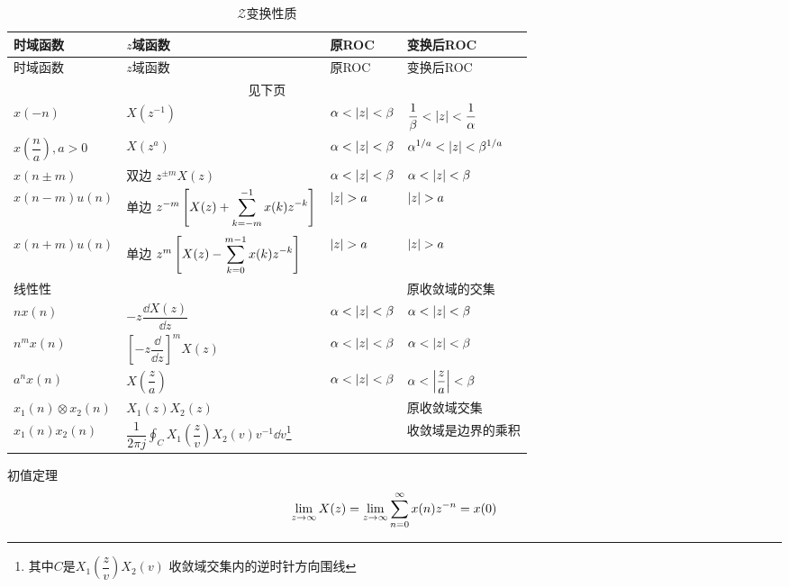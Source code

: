 \documentclass[cn,11pt,chinese,black,simple]{../elegantbook}
\begin{document}
\begin{longtable}{llll} 
    \caption{\(\mathscr{Z}\)变换性质} \\ 
    \toprule
    时域函数 & \(z\)域函数 & 原ROC  & 变换后ROC\\
    \midrule
    \endfirsthead
    
    \toprule
    时域函数 & \(z\)域函数 & 原ROC  & 变换后ROC\\
    \midrule
    \endhead 
  
    \hline
    \multicolumn{4}{c}{见下页}\\   \bottomrule
    \endfoot
  
    \bottomrule
    \endlastfoot
    \(x(-n)\) & \(X(z^{-1})\) & \(\alpha < \left| z \right| < \beta\) & \(\dfrac{1}{\beta} < \left| z \right| < \dfrac{1}{\alpha}\)\\
    \(x(\dfrac{n}{a}),a>0\) & \(X(z^a)\) & \(\alpha < \left| z \right| < \beta\) & \(\alpha^{1/a} < \left| z \right| < \beta^{1/a}\) \\
    \(x(n \pm m)\) & 双边 \(z^{\pm m}X(z)\) &  \(\alpha < \left| z \right| < \beta\) &  \(\alpha < \left| z \right| < \beta\) \\
    \(x(n - m)u(n)\) & 单边 \(z^{-m} \left[X(z) + \displaystyle\sum_{k=-m}^{-1}x(k)z^{-k}\right]\) & \(\left| z \right| > a\) & \(\left| z \right| > a\) \\
    \(x(n + m)u(n)\) & 单边 \(z^{m} \left[X(z) - \displaystyle\sum_{k=0}^{m-1}x(k)z^{-k}\right]\) & \(\left| z \right| > a\) & \(\left| z \right| > a\) \\
    线性性 & & & 原收敛域的交集 \\
    \(n x(n)\) & \(-z \dfrac{\dd{X(z)}}{\dd{z}}\) & \(\alpha < \left| z \right| < \beta\) & \(\alpha < \left| z \right| < \beta\)\\
    \(n^m x(n)\) & \(\left[-z\dfrac{\dd{}}{\dd{z}}\right]^m X(z)\) & \(\alpha < \left| z \right| < \beta\) & \(\alpha < \left| z \right| < \beta\)\\
    \(a^n x(n)\) & \(X(\dfrac{z}{a})\) &  \(\alpha < \left| z \right| < \beta\) &  \(\alpha < \left| \dfrac{z}{a} \right| < \beta\) \\
    \(x_1(n) \otimes x_2(n)\) & \(X_1(z) X_2(z)\) & & 原收敛域交集 \\
    \(x_1(n)x_2(n)\) & \(\dfrac{1}{2 \pi j}\displaystyle\oint_C X_1(\dfrac{z}{v})X_2(v) v^{-1} \dd{v} \)\footnote{其中\(C\)是\(X_1(\dfrac{z}{v})X_2(v)\) 收敛域交集内的逆时针方向围线} & & 收敛域是边界的乘积 \\
\end{longtable}

初值定理 \[\lim _{z \rightarrow \infty} X(z)=\lim _{z \rightarrow \infty} \displaystyle\sum_{n=0}^{\infty} x(n) z^{-n}=x(0)\]
\end{document}
